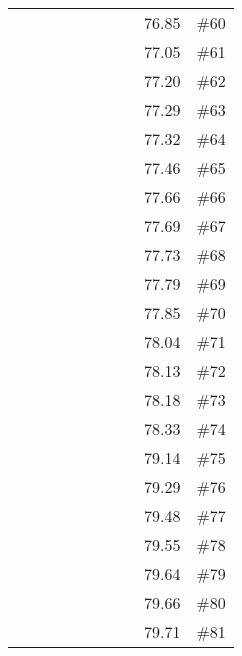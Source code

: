 \begin{longtable}{|c|c|c|c|c|c|c|c|c|c|}
 \x    & \x    &       & \x    & \x\m  & \x\m  &       &       & 76.85 & \#60 \\
 \x    & \x    &       & \x    & \x\m  &       &       & \x\m  & 77.05 & \#61 \\
 \x    & \x    & \x    & \x    &       & \x    & \x    &       & 77.20 & \#62 \\
 \x    & \x    & \x    & \x    & \x    & \x    &       &       & 77.29 & \#63 \\
 \x    & \x    & \x    &       &       & \x\m  & \x    &       & 77.32 & \#64 \\
 \x    & \x    & \x    &       & \x    & \x    &       & \x\m  & 77.46 & \#65 \\
 \x    & \x    & \x    & \x    &       &       &       &       & 77.66 & \#66 \\
 \x    & \x    &       &       & \x    &       &       &       & 77.69 & \#67 \\
 \x    & \x    & \x    &       & \x    & \x\m  & \x\m  &       & 77.73 & \#68 \\
 \x    & \x    &       & \x    & \x\m  &       &       &       & 77.79 & \#69 \\
 \x    & \x    & \x    & \x    & \x    & \x\m  & \x    &       & 77.85 & \#70 \\
 \x    & \x    & \x    & \x    &       & \x    &       &       & 78.04 & \#71 \\
 \x    & \x    &       &       & \x\m  &       & \x\m  &       & 78.13 & \#72 \\
 \x    & \x    & \x    &       & \x    & \x\m  &       & \x    & 78.18 & \#73 \\
 \x    & \x    & \x    & \x    &       & \x\m  & \x\m  &       & 78.33 & \#74 \\
 \x    & \x    & \x    & \x    &       &       &       & \x\m  & 79.14 & \#75 \\
 \x    & \x    & \x    &       &       &       &       &       & 79.29 & \#76 \\
 \x    & \x    & \x    &       &       & \x\m  &       & \x\m  & 79.48 & \#77 \\
 \x    & \x    & \x    & \x    &       & \x\m  &       & \x\m  & 79.55 & \#78 \\
 \x    & \x    & \x    &       &       &       &       & \x\m  & 79.64 & \#79 \\
 \x    & \x    &       &       & \x    & \x    &       &       & 79.66 & \#80 \\
 \x    & \x    & \x    &       & \x    & \x    & \x\m  &       & 79.71 & \#81 \\

\end{longtable}
